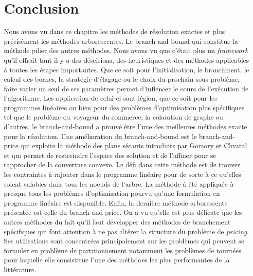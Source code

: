 \documentclass[12pt,a4paper,oneside]{book}
\theoremstyle{definition}
\begin{document}
		
			 
			
	
	
	
	\section{Conclusion}
    
    Nous avons vu dans ce chapitre les méthodes de résolution exactes et plus précisément les méthodes arborescentes. Le branch-and-bound qui constitue la méthode pilier des autres méthodes. Nous avons vu que c'était plus un \textit{framework} qu'il offrait tant il y a des déscisions, des heuristiques et des méthodes applicables à toutes les étapes importantes. Que ce soit pour l'initialisation, le branchment, le calcul des bornes, la stratégie d'élagage ou le choix du prochain sous-problème, faire varier un seul de ses paramètres permet d'inflencer le cours de l'exécution de l'algorithme. Les application de celui-ci sont légion, que ce soit pour les programmes linéaires ou bien pour des problèmes d'optimisation plus spécifiques tel que le problème du voyageur du commerce, la coloration de graphe ou d'autres, le branch-and-bound a prouvé être l'une des meilleures méthodes exacte pour la résolution. Une amélioration du branch-and-bound est le branch-and-price qui exploite la méthode des plans sécants introduits par Gomory et Chvatal et qui permet de restreindre l'espace des solution et de l'affiner pour se rapprocher de la couverture convexe. Le défi dans cette méthode est de trouver les contraintes à rajouter dans le programme linéaire pour de sorte à ce qu'elles soient valables dans tous les noeuds de l'arbre. La méthode à été appliquée à presque tous les problèmes d'optimisation pourvu qu'une formulation en programme linéaire est disponible. Enfin, la dernière méthode arborescente présentée est celle du branch-and-price. On a vu qu'elle est plus délicate que les autres méthodes du fait qu'il faut développer des méthodes de branchement spécifiques qui font attention à ne pas altérer la structure du problème de \textit{pricing}. Ses utilisations sont concentrées principalement sur les problèmes qui peuvent se formuler en problème de partitionnement notamment les problèmes de tournées pour laquelle elle consistitue l'une des méthdoes les plus performantes de la littérature.
    
\end{document}
